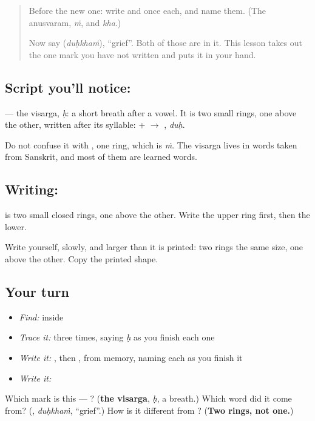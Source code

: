 \label{lesson:ML-W345-visarga}



\begin{quote}
Before the new one: write \textbf{} and \textbf{} once each, and name them. (The anusvaram, \emph{ṁ}, and \emph{kha}.)

Now say \textbf{} (\emph{duḥkhaṁ}), \textquotedblleft{}grief\textquotedblright{}. Both of those are in it. This lesson takes out the one mark you have not written and puts it in your hand.
\end{quote}

\subsection*{Script you'll notice: }
\textbf{} — the visarga, \emph{ḥ}: a short breath after a vowel. It is two small rings, one above the other, written after its syllable: \textbf{} + \textbf{} $\to$ \textbf{}, \emph{duḥ}.

Do not confuse it with \textbf{}, one ring, which is \emph{ṁ}. The visarga lives in words taken from Sanskrit, and most of them are learned words.

\subsection*{Writing: }
\textbf{} is two small closed rings, one above the other. Write the upper ring first, then the lower.

Write \textbf{} yourself, slowly, and larger than it is printed: two rings the same size, one above the other. Copy the printed shape.

\subsection*{Your turn}
\begin{itemize}
\raggedright
  \item \emph{Find:}  inside \textbf{}
  \item \emph{Trace it:}  three times, saying \emph{ḥ} as you finish each one
  \item \emph{Write it:} , then , from memory, naming each as you finish it
  \item \emph{Write it:} \textbf{}
\end{itemize}

\begin{tcolorbox}[breakable,colback=teal!4,colframe=teal!35!black,title={Before you move on}]
Which mark is this — ? (\textbf{the visarga}, \emph{ḥ}, a breath.) Which word did it come from? (\textbf{}, \emph{duḥkhaṁ}, \textquotedblleft{}grief\textquotedblright{}.) How is it different from \textbf{}? (\textbf{Two rings, not one.})
\end{tcolorbox}
